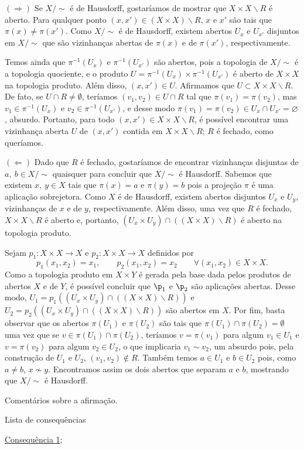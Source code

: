 \begin{dem}
    $(\Longrightarrow)$ Se $X/\sim$ é de Hausdorff, gostaríamos de mostrar que $X\times X\backslash R$ é aberto. Para qualquer ponto $(x,x')\in (X\times X)\backslash R$, $x$ e $x'$ são tais que $\pi(x)\neq \pi(x')$. Como $X/\sim$ é de Hausdorff, existem abertos $U_x$ e $U_{x'}$ disjuntos em $X/\sim$ que são vizinhanças abertas de $\pi(x)$ e de $\pi(x')$, respectivamente.%

    Temos ainda que $\pi^{-1}(U_x)$ e $\pi^{-1}(U_{x'})$ são abertos, pois a topologia de $X/\sim$ é a topologia quociente, e o produto $U=\pi^{-1}(U_x)\times \pi^{-1}(U_{x'})$ é aberto de $X\times X$ na topologia produto. Além disso, $(x,x')\in U$. Afirmamos que $U\subset X\times X\backslash R$. De fato, se $U\cap R\neq \emptyset$, teríamos $(v_1,v_2)\in U\cap R$ tal que $\pi(v_1)=\pi(v_2)$, mas $v_1 \in \pi^{-1}(U_x)$ e $v_2\in \pi^{-1}(U_{x'})$, e desse modo $\pi(v_1) = \pi(v_2) \in U_x \cap U_{x'} = \varnothing$, absurdo. Portanto, para todo $(x,x')\in X\times X\backslash R$, é possível encontrar uma vizinhança aberta $U$ de $(x,x')$ contida em $X\times X\backslash R$; $R$ é fechado, como queríamos.\newline

    $(\Longleftarrow)$ Dado que $R$ é fechado, gostaríamos de encontrar vizinhanças disjuntas de $a,~b\in X/\sim$ quaisquer para concluir que $X/\sim$ é Hausdorff. Sabemos que existem $x,~y\in X$ tais que $\pi(x)=a$ e $\pi(y)=b$ pois a projeção $\pi$ é uma aplicação sobrejetora. Como $X$ é de Hausdorff, existem abertos disjuntos $U_x$ e $U_y$, vizinhanças de $x$ e de $y$, respectivamente. Além disso, uma vez que $R$ é fechado, $X\times X\backslash R$ é aberto e, portanto, $(U_x\times U_y)\cap((X\times X)\backslash R)$ é aberto na topologia produto.

    Sejam $p_1:X\times X\rightarrow X$ e $p_2:X\times X\rightarrow X$ definidos por $$p_1(x_1,x_2)=x_1,\qquad p_2(x_1,x_2)=x_2 \qquad\forall (x_1,x_2)\in X\times X.$$ Como a topologia produto em $X\times Y$ é gerada pela base dada pelos produtos de abertos $X$ e de $Y$, é possível concluir que $\p_1$ e $\p_2$ são aplicações abertas. Desse modo, $U_1=p_1((U_x\times U_y)\cap((X\times X)\backslash R))$ e $U_2=p_2((U_x\times U_y)\cap((X\times X)\backslash R))$ são abertos em $X$. Por fim, basta observar que os abertos $\pi(U_1)$ e $\pi(U_2)$ são tais que $\pi(U_1)\cap \pi(U_2)=\emptyset$ uma vez que se $v\in \pi(U_1)\cap\pi(U_2)$, teríamos $v=\pi(v_1)$ para algum $v_1\in U_1$ e $v=\pi(v_2)$ para algum $v_2\in U_2$, o que implicaria $v_1\sim v_2$, um absurdo pois, pela construção de $U_1$ e $U_2$, $(v_1,v_2)\not\in R$.  Também temos $a\in U_1$ e $b\in U_2$ pois, como $a\neq b$, $x\not\sim y$. Encontramos assim os dois abertos que separam $a$ e $b$, mostrando que $X/\sim$ é Hausdorff.
\end{dem}

Comentários sobre a afirmação.

\begin{titlemize}{Lista de consequências}
	\item \hyperref[consequencia1]{Consequência 1};\\ %
\end{titlemize}

